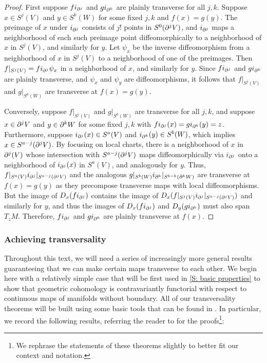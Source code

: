 \begin{proof}
	First suppose $fi_{\partial^j}$ and $gi_{\partial^k}$ are plainly transverse for all $j,k$.
	Suppose $x \in S^j(V)$ and $y \in S^k(W)$ for some fixed $j,k$ and $f(x) = g(y)$.
	The preimage of $x$ under $i_{\partial^j}$ consists of $j!$ points in $S^0(\partial^jV)$, and $i_{\partial^j}$ maps a neighborhood of each such preimage point diffeomorphically to a neighborhood of $x$ in $S^j(V)$, and similarly for $y$.
	Let $\psi_x$ be the inverse diffeomorphism from a neighborhood of $x$ in $S^j(V)$ to a neighborhood of one of the preimages.
	Then $f|_{S^j(V)} = fi_{\partial^j}\psi_x$ in a neighborhood of $x$, and similarly for $y$.
	Since $fi_{\partial^j}$ and $gi_{\partial^k}$ are plainly transverse, and $\psi_x$ and $\psi_y$ are diffeomorphisms, it follows that $f|_{S^j(V)}$ and $g|_{S^k(W)}$ are transverse at $f(x) = g(y)$.

	Conversely, suppose $f|_{S^j(V)}$ and $g|_{S^k(W)}$ are transverse for all $j,k$, and suppose $x \in \partial^jV$ and $y \in \partial^kW$ for some fixed $j,k$ with $fi_{\partial^j}(x) = gi_{\partial^k}(y) = z$.
	Furthermore, suppose $i_{\partial^j}(x) \in S^a(V)$ and $i_{\partial^k}(y) \in S^b(W)$, which implies $x \in S^{a-j}(\partial^j V)$.
	By focusing on local charts, there is a neighborhood of $x$ in $\partial^j(V)$ whose intersection with $S^{a-j}(\partial^j V)$ maps diffeomorphically via $i_{\partial^j}$ onto a neighborhood of $i_{\partial^j}(x)$ in $S^a(V)$, and analogously for $y$.
	Thus, $f|_{S^a(V)}i_{\partial^j}|_{S^{a-j}(\partial^j V)}$ and the analogous $g|_{S^b(W)}i_{\partial^k}|_{S^{b-k}(\partial^k W)}$ are transverse at $f(x) = g(y)$ as they precompose transverse maps with local diffeomorphisms.
	But the image of $D_x(fi_{\partial^j})$ contains the image of $D_x(f|_{S^j(V)}i_{\partial^j}|_{S^{a-j}(\partial^j V)})$ and similarly for $y$, and thus the images of $D_x(fi_{\partial^j})$ and $D_y(gi_{\partial^k})$ must also span $T_{z}M$.
	Therefore, $fi_{\partial^j}$ and $gi_{\partial^k}$ are plainly transverse at $f(x)$.
\end{proof}

\subsubsection{Achieving transversality}

Throughout this text, we will need a series of increasingly more general results guaranteeing that we can make certain maps transverse to each other.
We begin here with a relatively simple case that will be first used in \cref{S: basic properties} to show that geometric cohomology is contravariantly functorial with respect to continuous maps of manifolds without boundary.
All of our transversality theorems will be built using some basic tools that can be found in \cite[Section 2.3]{GuPo74}.
In particular, we record the following results, referring the reader to \cite[Section 2.3]{GuPo74} for the proofs\footnote{We rephrase the statements of these theorems slightly to better fit our context and notation.}:

